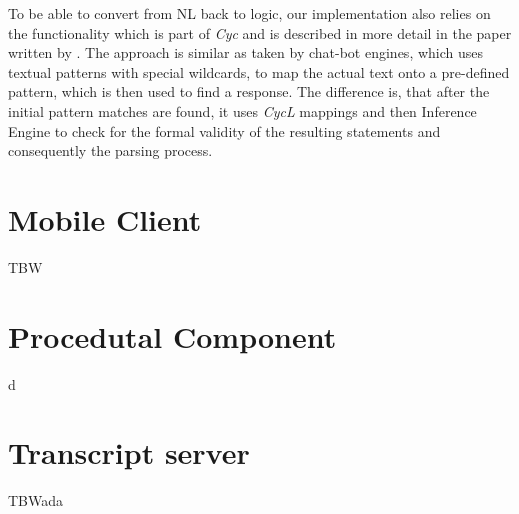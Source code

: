 To be able to convert from NL back to logic, our implementation also relies on
the functionality which is part of \emph{Cyc} and is described in more detail
in the paper written by \textcite{Schneider2015}. The approach is similar as
taken by chat-bot engines\parencite{Wilcox2011}, which uses textual patterns
with special wildcards, to map the actual text onto a pre-defined pattern, which
is then used to find a response. The difference is, that after the initial 
pattern matches are found, it uses \emph{CycL} mappings and then Inference 
Engine to check for
the formal validity of the resulting statements and consequently the parsing 
process.

\section{Mobile Client}
\label{section:app}
TBW

\section{Procedutal Component}
\label{section:prophet}
d
\section{Transcript server}
\label{section:transcriptserver}
TBWada
